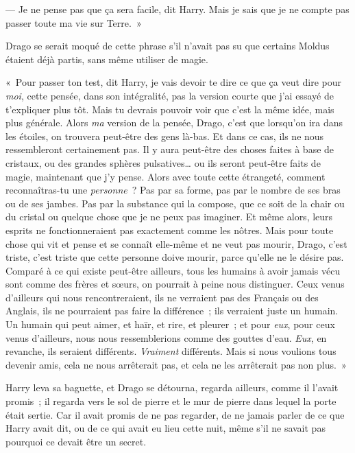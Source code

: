 --- Je ne pense pas que ça sera facile, dit Harry.
Mais je sais que je ne compte pas passer toute ma vie sur Terre.~»

Drago se serait moqué de cette phrase s'il n'avait pas su que certains Moldus étaient déjà partis, sans même utiliser de magie.

«~Pour passer ton test, dit Harry, je vais devoir te dire ce que ça veut dire pour \emph{moi}, cette pensée, dans son intégralité, pas la version courte que j'ai essayé de t'expliquer plus tôt.
Mais tu devrais pouvoir voir que c'est la même idée, mais plus générale.
Alors \emph{ma} version de la pensée, Drago, c'est que lorsqu'on ira dans les étoiles, on trouvera peut-être des gens là-bas.
Et dans ce cas, ils ne nous ressembleront certainement pas.
Il y aura peut-être des choses faites à base de cristaux, ou des grandes sphères pulsatives… ou ils seront peut-être faits de magie, maintenant que j'y pense.
Alors avec toute cette étrangeté, comment reconnaîtras-tu une \emph{personne}~?
Pas par sa forme, pas par le nombre de ses bras ou de ses jambes.
Pas par la substance qui la compose, que ce soit de la chair ou du cristal ou quelque chose que je ne peux pas imaginer.
Et même alors, leurs esprits ne fonctionneraient pas exactement comme les nôtres.
Mais pour toute chose qui vit et pense et se connaît elle-même et ne veut pas mourir, Drago, c'est triste, c'est triste que cette personne doive mourir, parce qu'elle ne le désire pas.
Comparé à ce qui existe peut-être ailleurs, tous les humains à avoir jamais vécu sont comme des frères et sœurs, on pourrait à peine nous distinguer.
Ceux venus d'ailleurs qui nous rencontreraient, ils ne verraient pas des Français ou des Anglais, ils ne pourraient pas faire la différence~; ils verraient juste un humain.
Un humain qui peut aimer, et haïr, et rire, et pleurer~; et pour \emph{eux}, pour ceux venus d'ailleurs, nous nous ressemblerions comme des gouttes d'eau.
\emph{Eux}, en revanche, ils seraient différents.
\emph{Vraiment} différents.
Mais si nous voulions tous devenir amis, cela ne nous arrêterait pas, et cela ne les arrêterait pas non plus.~»

Harry leva sa baguette, et Drago se détourna, regarda ailleurs, comme il l'avait promis~; il regarda vers le sol de pierre et le mur de pierre dans lequel la porte était sertie.
Car il avait promis de ne pas regarder, de ne jamais parler de ce que Harry avait dit, ou de ce qui avait eu lieu cette nuit, même s'il ne savait pas pourquoi ce devait être un secret.


